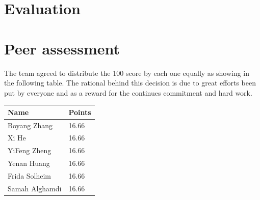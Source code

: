 \documentclass{article}
\begin{document}
\section{Evaluation}

\section{Peer assessment}
The team agreed to distribute the 100 score by each one equally as showing in the following table. The rational behind this decision is due to great efforts been put by everyone and as a reward for the continues commitment and hard work.


\begin{center}
\begin{tabular}{ | m{3cm}| m{1.3cm} | }
\hline
\textbf{Name} & \textbf{Points}  \\
\hline
Boyang Zhang & 16.66  \\
\hline
Xi He & 16.66  \\
\hline
YiFeng Zheng & 16.66 \\
\hline
Yenan Huang & 16.66 \\
\hline
Frida Solheim & 16.66 \\
\hline
Samah Alghamdi & 16.66 \\
\hline
\end{tabular}
\end{center}
\end{document}

